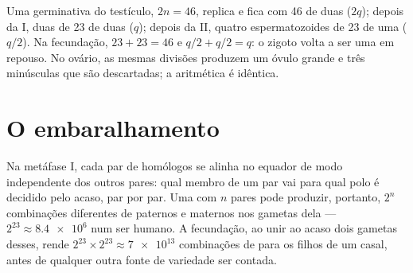 \begin{example}\label{ex:g12:meiosis-genetic-shuffling:numbers}
Uma  germinativa do testículo, $2n = 46$, replica e fica com 46
 de duas  ($2q$); depois da  I, duas 
de 23  de duas  ($q$); depois da  II, quatro
espermatozoides de 23  de uma  ($q/2$). Na
fecundação, $23 + 23 =
46$ e $q/2 + q/2 = q$: o zigoto volta a ser uma   em
repouso. No ovário, as mesmas divisões produzem um óvulo grande e três
 minúsculas que são descartadas; a aritmética é idêntica.
\end{example}

\section{O embaralhamento}

\begin{proposition}\label{prop:g12:meiosis-genetic-shuffling:assortment}
Na metáfase I, cada par de homólogos se alinha no equador de modo
independente dos outros pares: qual membro de um par vai para qual polo
é decidido pelo acaso, par por par. Uma  com $n$ pares pode
produzir, portanto, $2^n$ combinações diferentes de 
paternos e maternos nos gametas dela --- $2^{23} \approx \num{8.4e6}$
num ser humano. A fecundação, ao unir ao acaso dois gametas desses,
rende $2^{23}
\times 2^{23} \approx \num{7e13}$ combinações de  para os
filhos de um casal, antes de qualquer outra fonte de variedade ser
contada.
\end{proposition}
\admitted

